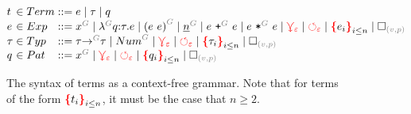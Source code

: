 \documentclass[nonacm, acmsmall, screen, review]{acmart}
\newcommand{\e}{\varepsilon}
\newcommand{\id}[1]{\textcolor{gray}{\ensuremath{#1}}}
\newcommand{\eid}[2]{{#2}^{\id{#1}}}
\newcommand{\eVar}[2]{\eid{#1}{#2}}
\newcommand{\eFun}[4]{\eid{#1}{\lambda}#2{:}#3{.}#4}
\newcommand{\eApp}[3]{\eid{#1}{\left(#2~#3\right)}}
\newcommand{\eNum}[2]{\eid{#1}{\underline{#2}}}
\newcommand{\ePlus}[3]{#2~\eid{#1}{\texttt{+}}~#3}
\newcommand{\eTimes}[3]{#2~\eid{#1}{\texttt{*}}~#3}
\newcommand{\pVar}[2]{\eid{#1}{#2}}
\newcommand{\tArrow}[3]{#2 \eid{#1}{\rightarrow} #3}
\newcommand{\tNum}[1]{\eid{#1}{Num}}
\newcommand{\conflictHole}[1]{%
{\noexpandarg\StrSubstitute{#1}{,}{\textcolor{red}{\,\textbf{|}\,}}[\myargs]%
{\textcolor{red}{\textbf{\{}}\myargs\textcolor{red}{\textbf{\}}}}}}%
\newcommand{\emptyHole}[2]{\square_{\id{(#1, #2)}}}
\newcommand{\multiVertex}[1]{\textcolor{red}{\ensuremath{\curlyveedownarrow_{#1}}}}
\newcommand{\cycleVertex}[1]{\textcolor{red}{\ensuremath{\circlearrowleft_{#1}}}}
\begin{document}
\begin{figure}
  \[
    \arraycolsep=0pt
    \begin{array}{lcllll}
      t & {}\in{} & Term & {}::={} &
        e
        \mid \tau
        \mid q
      \\
      e & {}\in{} & Exp & {}::={} &
        \eVar{G}{x}
        \mid \eFun{G}{q}{\tau}{e}
        \mid \eApp{G}{e}{e}
        \mid \eNum{G}{n}
        \mid \ePlus{G}{e}{e}
        \mid \eTimes{G}{e}{e}
        \mid \multiVertex{\e}
        \mid \cycleVertex{\e}
        \mid \conflictHole{e_i}_{i \leq n}
        \mid \emptyHole{v}{p}
      \\
      \tau & {}\in{} & Typ & {}::={} &
        \tArrow{G}{\tau}{\tau}
        \mid \tNum{G}
        \mid \multiVertex{\e}
        \mid \cycleVertex{\e}
        \mid \conflictHole{\tau_i}_{i \leq n}
        \mid \emptyHole{v}{p}
      \\
      q & {}\in{} & Pat{} & {}::={} &
        \pVar{G}{x}
        \mid \multiVertex{\e}
        \mid \cycleVertex{\e}
        \mid \conflictHole{q_i}_{i \leq n}
        \mid \emptyHole{v}{p}
      \\
    \end{array}
  \]  
  \caption{
    The syntax of terms as a context-free grammar.
    Note that for terms of the form $\protect\conflictHole{t_i}_{i \leq n}$,
    it must be the case that $n \geq 2$.
  }
  \label{fig:syntax}
\end{figure}



\end{document}
